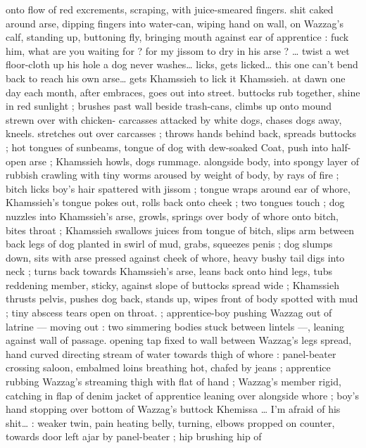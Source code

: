 onto flow of red excrements, scraping, with juice-smeared fingers. 
shit caked around arse, dipping fingers into water-can, wiping hand 
on wall, on Wazzag's calf, standing up, buttoning fly, bringing mouth 
against ear of apprentice : {\gl} fuck him, what are you waiting for ? {\td} 
for my jissom to dry in his arse ? {\ldots} twist a wet floor-cloth up his 
hole{\td} a dog never washes{\ldots} licks, gets licked{\ldots} this one can't bend 
back to reach his own arse{\ldots} gets Khamssieh to lick it{\td} Khamssieh. 
at dawn one day each month, after embraces, goes out into street. 
buttocks rub together, shine in red sunlight ; brushes past wall 
beside trash-cans, climbs up onto mound strewn over with chicken- 
carcasses attacked by white dogs, chases dogs away, kneels. 
stretches out over carcasses ; throws hands behind back, spreads 
buttocks ; hot tongues of sunbeams, tongue of dog with dew-soaked 
Coat, push into half-open arse ; Khamssieh howls, dogs rummage. 
alongside body, into spongy layer of rubbish crawling with tiny 
worms aroused by weight of body, by rays of fire ; bitch licks boy's 
hair spattered with jissom ; tongue wraps around ear of whore, 
Khamssieh's tongue pokes out, rolls back onto cheek ; two tongues 
touch ; dog nuzzles into Khamssieh's arse, growls, springs over body 
of whore onto bitch, bites throat ; Khamssieh swallows juices from 
tongue of bitch, slips arm between back legs of dog planted in swirl 
of mud, grabs, squeezes penis ; dog slumps down, sits with arse 
pressed against cheek of whore, heavy bushy tail digs into neck ; 
turns back towards Khamssieh's arse, leans back onto hind legs, 
tubs reddening member, sticky, against slope of buttocks spread 
wide ; Khamssieh thrusts pelvis, pushes dog back, stands up, wipes 
front of body spotted with mud ; tiny abscess tears open on throat.{\gr} 
; apprentice-boy pushing Wazzag out of latrine --- moving out : two 
simmering bodies stuck between lintels ---, leaning against wall of 
passage. opening tap fixed to wall between Wazzag's legs spread, 
hand curved directing stream of water towards thigh of whore : 
panel-beater crossing saloon, embalmed loins breathing hot, chafed 
by jeans ; apprentice rubbing Wazzag's streaming thigh with flat of 
hand ; Wazzag's member rigid, catching in flap of denim jacket of 
apprentice leaning over alongside whore ; boy's hand stopping over 
bottom of Wazzag's buttock{\td} {\gl} Khemissa {\ldots} I'm afraid of his shit{\ldots} {\gr} 
: weaker twin, pain heating belly, turning, elbows propped on 
counter, towards door left ajar by panel-beater ; hip brushing hip of 
